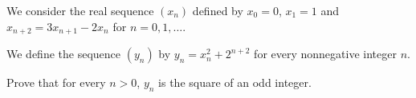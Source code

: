 \documentclass[varwidth]{standalone}
\begin{document}
    We consider the real sequence $(x_n)$ defined by $x_0 = 0$, $x_1 = 1$ and $x_{n + 2} = 3x_{n + 1} - 2x_n$ for $n = 0, 1, \dots$.

    We define the sequence $(y_n)$ by $y_n = x_n^2 + 2^{n + 2}$ for every nonnegative integer $n$.

    Prove that for every $n > 0$, $y_n$ is the square of an odd integer.
\end{document}
